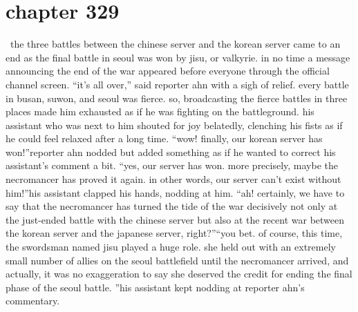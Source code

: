 \section{chapter 329}






 the three battles between the chinese server and the korean server came to an end as the final battle in seoul was won by jisu, or valkyrie.
in no time a message announcing the end of the war appeared before everyone through the official channel screen.
“it’s all over,” said reporter ahn with a sigh of relief.
every battle in busan, suwon, and seoul was fierce.
 so, broadcasting the fierce battles in three places made him exhausted as if he was fighting on the battleground.
his assistant who was next to him shouted for joy belatedly, clenching his fists as if he could feel relaxed after a long time.
“wow! finally, our korean server has won!”reporter ahn nodded but added something as if he wanted to correct his assistant’s comment a bit.
“yes, our server has won.
 more precisely, maybe the necromancer has proved it again.
 in other words, our server can’t exist without him!”his assistant clapped his hands, nodding at him.
“ah! certainly, we have to say that the necromancer has turned the tide of the war decisively not only at the just-ended battle with the chinese server but also at the recent war between the korean server and the japanese server, right?”“you bet.
 of course, this time, the swordsman named jisu played a huge role.
 she held out with an extremely small number of allies on the seoul battlefield until the necromancer arrived, and actually, it was no exaggeration to say she deserved the credit for ending the final phase of the seoul battle.
”his assistant kept nodding at reporter ahn’s commentary.

